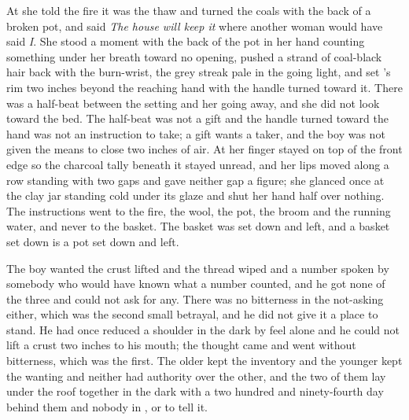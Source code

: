 At  she told the fire it was the thaw and turned the coals with the back of a broken pot, and said \emph{The house will keep it} where another woman would have said \emph{I}. She stood a moment with the back of the pot in her hand counting something under her breath toward no opening, pushed a strand of coal-black hair back with the burn-wrist, the grey streak pale in the going light, and set 's rim two inches beyond the reaching hand with the handle turned toward it. There was a half-beat between the setting and her going away, and she did not look toward the bed. The half-beat was not a gift and the handle turned toward the hand was not an instruction to take; a gift wants a taker, and the boy was not given the means to close two inches of air. At  her finger stayed on top of the front edge so the charcoal tally beneath it stayed unread, and her lips moved along a row standing with two gaps and gave neither gap a figure; she glanced once at the clay jar standing cold under its glaze and shut her hand half over nothing. The instructions went to the fire, the wool, the pot, the broom and the running water, and never to the basket. The basket was set down and left, and a basket set down is a pot set down and left.

The boy wanted the crust lifted and the thread wiped and a number spoken by somebody who would have known what a number counted, and he got none of the three and could not ask for any. There was no bitterness in the not-asking either, which was the second small betrayal, and he did not give it a place to stand. He had once reduced a shoulder in the dark by feel alone and he could not lift a crust two inches to his mouth; the thought came and went without bitterness, which was the first. The older kept the inventory and the younger kept the wanting and neither had authority over the other, and the two of them lay under the roof together in the dark with a two hundred and ninety-fourth day behind them and nobody in ,  or  to tell it.

\scenebreak

